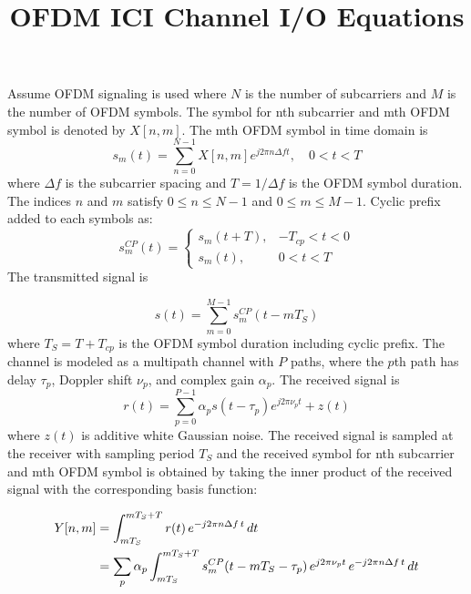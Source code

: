 \documentclass[11pt]{article}
\title{OFDM ICI Channel I/O Equations}
\author{}
\date{}
\begin{document}
\maketitle

Assume OFDM signaling is used where \(N\) is the number of subcarriers and \(M\) is the number of OFDM symbols. The symbol for nth subcarrier and mth OFDM symbol is denoted by \(X[n,m]\). The mth OFDM symbol in time domain is
\begin{equation}
    s_m(t) = \sum_{n=0}^{N-1}X[n,m]e^{j2\pi n\Delta f t}, \quad 0 < t < T
\end{equation}
where \(\Delta f\) is the subcarrier spacing and \(T = 1/\Delta f\) is the OFDM symbol duration. The indices \(n\) and \(m\) satisfy \(0 \leq n \leq N-1\) and \(0 \leq m \leq M-1\). Cyclic prefix added to each symbols as:
\begin{equation}
    s_m^{CP}(t) = \begin{cases} s_m(t + T), & -T_{cp} < t < 0 \\ s_m(t), & 0 < t < T \end{cases}
\end{equation}
The transmitted signal is

\begin{equation}
    s(t) = \sum_{m=0}^{M-1} s_m^{CP}(t - mT_S)
\end{equation}
where \(T_S = T + T_{cp}\) is the OFDM symbol duration including cyclic prefix.
The channel is modeled as a multipath channel with \(P\) paths, where the \(p\)th path has delay \(\tau_p\), Doppler shift \(\nu_p\), and complex gain \(\alpha_p\). The received signal is
\begin{equation}
    r(t) = \sum_{p=0}^{P-1} \alpha_p s(t - \tau_p) e^{j2\pi \nu_p t} + z(t)
\end{equation}
where \(z(t)\) is additive white Gaussian noise. The received signal is sampled at the receiver with sampling period \(T_S\) and the received symbol for nth subcarrier and mth OFDM symbol is obtained by taking the inner product of the received signal with the corresponding basis function:

\begin{align}
Y[n,m]
&= \int_{mT_S}^{mT_S+T} r(t)\, e^{-j2\pi n\Delta f\, t}\, dt \notag \\
&= \sum_p \alpha_p
   \int_{mT_S}^{mT_S+T} s_m^{CP}(t - mT_S - \tau_p)\,
   e^{j2\pi \nu_p t}\, e^{-j2\pi n\Delta f\, t}\, dt
\end{align}
\end{document}
